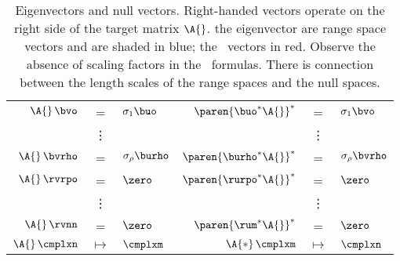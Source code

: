 \clearpage
\begin{table}[htdp]
\caption[Eigenvectors and null vectors]{Eigenvectors and null vectors. Right-handed vectors operate on the right side of the target matrix $\A{}$. the eigenvector are range space vectors and are shaded in blue; the \ns \ vectors in red. Observe the absence of scaling factors in the \ns \ formulas. There is connection between the length scales of the range spaces and the null spaces.}
\begin{center}
\begin{tabular}{rclrcl}
%
  $\A{}\, \bvo$ & = & $\sigma_{1} \buo$ & \qquad $\paren{ \buo^{*} \A{} }^{*}$ & = & $\sigma_{1} \bvo$\\
%
   & \vdots &&& \vdots& \\
%
  $\A{}\, \bvrho$ & = & $\sigma_{\rho} \burho$ & \qquad $\paren{ \burho^{*} \A{} }^{*}$ & = & $\sigma_{\rho} \bvrho$ \\[20pt]
%
  $\A{}\, \rvrpo$ & = & $\zero$ & \qquad $\paren{ \rurpo^{*} \A{} }^{*}$ & = & $\zero$ \\
%
   & \vdots &&& \vdots& \\
%
  $\A{}\, \rvnn$ & = & $\zero$ & \qquad $\paren{ \rum^{*} \A{} }^{*}$ & = & $\zero$ \\[20pt]
%
 $\A{}\,\cmplxn$ & $\mapsto$ &  $\cmplxm$ & $\A{*}\,\cmplxm$ & $\mapsto$ &  $\cmplxn$
%
\end{tabular}
\end{center}
\label{tab:svd vectors}
\end{table}



\endinput